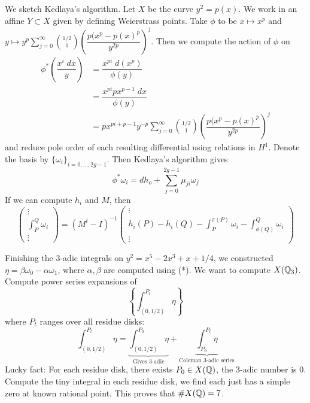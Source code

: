 We sketch Kedlaya's algorithm. Let $X$ be the curve $y^2= p(x)$. We work in an affine $Y \subset X$ given by defining Weierstrass points. Take $\phi$ to be $x \mapsto x^p$ and $y \mapsto y^p \sum_{j=0}^\infty \binom{1/2}{1} \left( \dfrac{p(x^p - p(x)^p}{y^{2p}} \right)^j$. Then we compute the action of $\phi$ on
	\[
	\begin{aligned}
	\phi^*\left( \dfrac{x^i \;dx}{y} \right)&= \dfrac{x^{pi} \;d(x^p)}{\phi(y)} \\
	&= \dfrac{x^{pi} p x^{p-1} \;dx}{\phi(y)} \\
	&= p x^{pi + p - 1} y^{-p} \sum_{j=0}^\infty \binom{1/2}{1} \left( \dfrac{p(x^p - p(x)^p}{y^{2p}} \right)^j
	\end{aligned}
	\]
and reduce pole order of each resulting differential using relations in $H^1$. Denote the basis by $\{\omega_i\}_{i=0,\ldots,2g-1}$. Then Kedlaya's algorithm gives
	\[
	\phi^* \omega_i= dh_o + \sum_{j=0}^{2g-1} \mu_{ji} \omega_j
	\]
If we can compute $h_i$ and $M$, then
	\[
	\begin{pmatrix}
	\vdots \\
	\int_P^Q \omega_i \\
	\vdots
	\end{pmatrix}=
	(M^t - I)^{-1} 
	\begin{pmatrix}
	\vdots \\
	h_i(P) - h_i(Q) - \int_P^{\pi(P)} \omega_i - \int_{\phi(Q)}^Q \omega_i \\
	\vdots
	\end{pmatrix}
	\] %


Finishing the 3-adic integrals on $y^2= x^5 - 2x^3 + x + 1/4$, we constructed $\eta= \beta \omega_0 - \alpha \omega_1$, where $\alpha,\beta$ are computed using (*). We want to compute $X(\mathbb{Q}_3)$. Compute power series expansions of
	\[
	\left\{ \int_{(0,1/2)}^{P_t} \eta \right\}
	\]
where $P_t$ ranges over all residue disks:
	\[
	\int_{(0,1/2)}^{P_t} \eta= \underbrace{\int_{(0,1/2)}^{P_0} \eta}_{\text{Gives 3-adic}} + \underbrace{\int_{P_0}^{P_t} \eta}_{\text{Coleman 3-adic series}}
	\]
Lucky fact: For each residue disk, there exists $P_0 \in X(\mathbb{Q})$, the 3-adic number is 0. Compute the tiny integral in each residue disk, we find each just has a simple zero at known rational point. This proves that $\#X(\mathbb{Q})= 7$. 








 